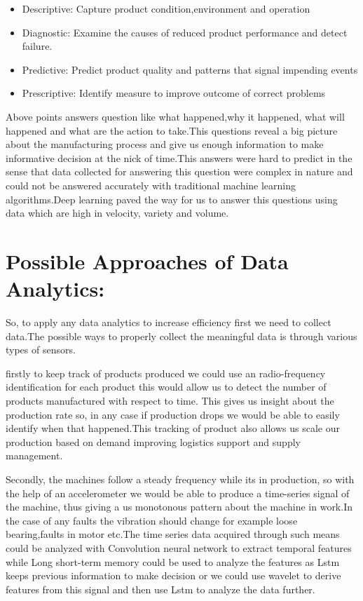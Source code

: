 \documentclass{article}
\begin{document}
\begin{normalsize}
\begin{itemize}
\item{Descriptive: Capture product condition,environment and operation}
\item{Diagnostic: Examine the causes of reduced product performance and detect failure. 
} 
\item{Predictive: Predict product quality and patterns that signal impending events}
\item{Prescriptive: Identify measure to improve outcome of correct problems}
	\end{itemize}
		Above points answers question like what happened,why it happened, what will happened and what are the action to take.This questions reveal a big picture about the manufacturing process and give us enough information to make informative decision at the nick of time.This answers were hard to predict in the sense that data collected for answering this question were complex in nature and could not be answered accurately with traditional machine learning algorithms.Deep learning paved the way for us to answer this questions using data which are high in velocity, variety and volume.
      \section{Possible Approaches of Data Analytics:}  
      So, to apply any data analytics  to increase efficiency first we need to collect data.The possible ways to properly collect the meaningful data is through various types of sensors.
      
      firstly to keep track of products produced we could use an radio-frequency identification for each product this would allow us to detect the number of products manufactured with respect to time. This gives us insight about the production rate so, in any case if production drops we would be able to easily identify when that happened.This tracking of product also allows us scale our production based on demand improving logistics support and supply management.
      
      Secondly, the machines follow a steady frequency while its in production, so with the help of an accelerometer we would be able to produce a time-series signal of the machine, thus giving a us monotonous pattern about the machine in work.In the case of any faults the vibration should change for example loose bearing,faults in motor etc.The time series data acquired through such means could be analyzed with Convolution neural network to extract temporal features while  Long short-term memory could be used to analyze the features as Lstm keeps previous information to make decision or we could use wavelet to derive features from this signal and then use Lstm to analyze the data further.
      

\end{normalsize}
\end{document}
